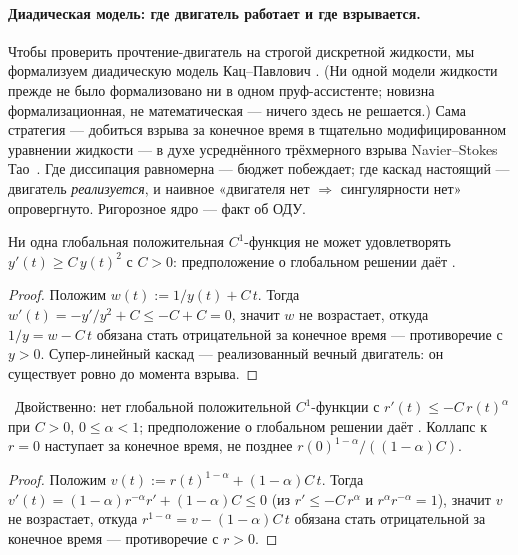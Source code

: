 \paragraph{Диадическая модель: где двигатель работает и где взрывается.}
Чтобы проверить прочтение-двигатель на строгой дискретной жидкости, мы формализуем диадическую модель
Кац--Павлович \cite{katz-pavlovic2005}. (Ни одной модели жидкости прежде не было формализовано ни в
одном пруф-ассистенте; новизна формализационная, не математическая --- ничего здесь не решается.)
Сама стратегия --- добиться взрыва за конечное время в тщательно модифицированном уравнении жидкости
--- в духе усреднённого трёхмерного взрыва {Navier--Stokes} Тао~\cite{tao2016}.
Где диссипация равномерна --- бюджет побеждает; где каскад настоящий --- двигатель
\emph{реализуется}, и наивное «двигателя нет $\Rightarrow$ сингулярности нет» опровергнуто.
Ригорозное ядро --- факт об ОДУ.

\begin{theorem}\label{thm:superlinear_blowup_sq}
Ни одна глобальная положительная $C^1$-функция не может удовлетворять $y'(t) \ge C\,y(t)^2$ с
$C > 0$: предположение о глобальном решении даёт . \green{}
\end{theorem}

\begin{proof}
Положим $w(t) := 1/y(t) + C\,t$. Тогда $w'(t) = -y'/y^2 + C \le -C + C = 0$, значит $w$ не
возрастает, откуда $1/y = w - C\,t$ обязана стать отрицательной за конечное время --- противоречие с
$y > 0$. Супер-линейный каскад --- реализованный вечный двигатель: он существует ровно до момента
взрыва.
\end{proof}

\begin{theorem}\label{thm:sublinear_collapse_extinction}
\green{}\ Двойственно: нет глобальной положительной $C^1$-функции с $r'(t) \le -C\,r(t)^{\alpha}$ при
$C>0$, $0 \le \alpha < 1$; предположение о глобальном решении даёт . Коллапс к $r=0$
наступает за конечное время, не позднее $r(0)^{1-\alpha}/((1-\alpha)C)$.
\end{theorem}

\begin{proof}
Положим $v(t) := r(t)^{1-\alpha} + (1-\alpha)C\,t$. Тогда
$v'(t) = (1-\alpha)r^{-\alpha}r' + (1-\alpha)C \le 0$ (из $r'\le -C\,r^{\alpha}$ и
$r^{\alpha}r^{-\alpha}=1$), значит $v$ не возрастает, откуда $r^{1-\alpha} = v - (1-\alpha)C\,t$
обязана стать отрицательной за конечное время --- противоречие с $r>0$.
\end{proof}

